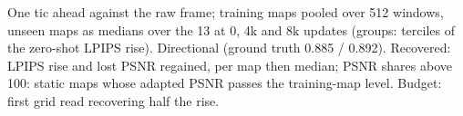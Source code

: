 \caption{One tic ahead against the raw frame; training maps pooled over 512 windows, unseen maps as medians over the 13 at 0, 4k and 8k updates (groups: terciles of the zero-shot LPIPS rise). Directional (ground truth 0.885 / 0.892). Recovered: LPIPS rise and lost PSNR regained, per map then median; PSNR shares above 100: static maps whose adapted PSNR passes the training-map level. Budget: first grid read recovering half the rise.}
